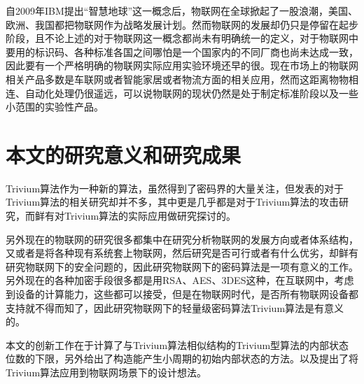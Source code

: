 自2009年IBM提出“智慧地球”这一概念后，物联网在全球掀起了一股浪潮，美国、欧洲、我国都把物联网作为战略发展计划。然而物联网的发展却仍只是停留在起步阶段，且不论上述的对于物联网这一概念都尚未有明确统一的定义，对于物联网中要用的标识码、各种标准各国之间哪怕是一个国家内的不同厂商也尚未达成一致，因此要有一个严格明确的物联网实际应用实验环境还早的很。现在市场上的物联网相关产品多数是车联网或者智能家居或者物流方面的相关应用，然而这距离物物相连、自动化处理仍很遥远，可以说物联网的现状仍然是处于制定标准阶段以及一些小范围的实验性产品。

\section{本文的研究意义和研究成果}

Trivium算法作为一种新的算法，虽然得到了密码界的大量关注，但发表的对于Trivium算法的相关研究却并不多，其中更是几乎都是对于Trivium算法的攻击研究，而鲜有对Trivium算法的实际应用做研究探讨的。

另外现在的物联网的研究很多都集中在研究分析物联网的发展方向或者体系结构，又或者是将各种现有系统套上物联网，然后研究是否可行或者有什么优劣，却鲜有研究物联网下的安全问题的，因此研究物联网下的密码算法是一项有意义的工作。另外现在的各种加密手段很多都是用RSA、AES、3DES这种，在互联网中，考虑到设备的计算能力，这些都可以接受，但是在物联网时代，是否所有物联网设备都支持就不得而知了，因此研究物联网下的轻量级密码算法Trivium算法是有意义的。

本文的创新工作在于计算了与Trivium算法相似结构的Trivium型算法的内部状态位数的下限，另外给出了构造能产生小周期的初始内部状态的方法。以及提出了将Trivium算法应用到物联网场景下的设计想法。
